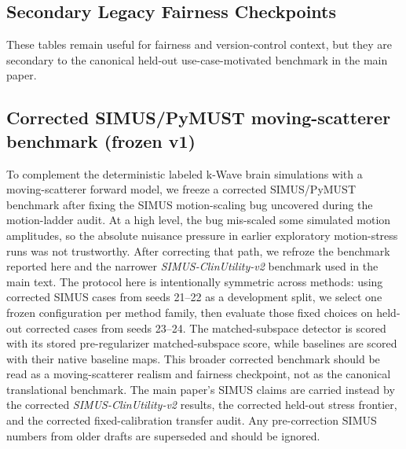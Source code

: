 
\subsection*{Secondary Legacy Fairness Checkpoints}
These tables remain useful for fairness and version-control context, but they are secondary to the canonical held-out use-case-motivated benchmark in the main paper.

\subsection{Corrected SIMUS/PyMUST moving-scatterer benchmark (frozen v1)}
\label{app:simus-frozen-benchmark}
To complement the deterministic labeled k-Wave brain simulations with a moving-scatterer forward model, we freeze a corrected SIMUS/PyMUST benchmark after fixing the SIMUS motion-scaling bug uncovered during the motion-ladder audit. At a high level, the bug mis-scaled some simulated motion amplitudes, so the absolute nuisance pressure in earlier exploratory motion-stress runs was not trustworthy. After correcting that path, we refroze the benchmark reported here and the narrower \emph{SIMUS-ClinUtility-v2} benchmark used in the main text. The protocol here is intentionally symmetric across methods: using corrected SIMUS cases from seeds 21--22 as a development split, we select one frozen configuration per method family, then evaluate those fixed choices on held-out corrected cases from seeds 23--24. The matched-subspace detector is scored with its stored pre-regularizer matched-subspace score, while baselines are scored with their native baseline maps. This broader corrected benchmark should be read as a moving-scatterer realism and fairness checkpoint, not as the canonical translational benchmark. The main paper's SIMUS claims are carried instead by the corrected \emph{SIMUS-ClinUtility-v2} results, the corrected held-out stress frontier, and the corrected fixed-calibration transfer audit. Any pre-correction SIMUS numbers from older drafts are superseded and should be ignored.

